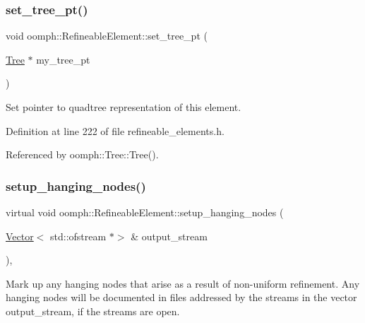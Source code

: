 \subsubsection{\texorpdfstring{set\+\_\+tree\+\_\+pt()}{set\_tree\_pt()}}
{\footnotesize\ttfamily void oomph\+::\+Refineable\+Element\+::set\+\_\+tree\+\_\+pt (\begin{DoxyParamCaption}\item[{\hyperlink{classoomph_1_1Tree}{Tree} $\ast$}]{my\+\_\+tree\+\_\+pt }\end{DoxyParamCaption})\hspace{0.3cm}{\ttfamily [inline]}}



Set pointer to quadtree representation of this element. 



Definition at line 222 of file refineable\+\_\+elements.\+h.



Referenced by oomph\+::\+Tree\+::\+Tree().

\mbox{\label{classoomph_1_1RefineableElement_a9368e9ffa7d06a436253d0e23f874d65}} 
\subsubsection{\texorpdfstring{setup\+\_\+hanging\+\_\+nodes()}{setup\_hanging\_nodes()}}
{\footnotesize\ttfamily virtual void oomph\+::\+Refineable\+Element\+::setup\+\_\+hanging\+\_\+nodes (\begin{DoxyParamCaption}\item[{\hyperlink{classoomph_1_1Vector}{Vector}$<$ std\+::ofstream $\ast$$>$ \&}]{output\+\_\+stream }\end{DoxyParamCaption})\hspace{0.3cm}{\ttfamily [inline]}, {\ttfamily [virtual]}}



Mark up any hanging nodes that arise as a result of non-\/uniform refinement. Any hanging nodes will be documented in files addressed by the streams in the vector output\+\_\+stream, if the streams are open. 



